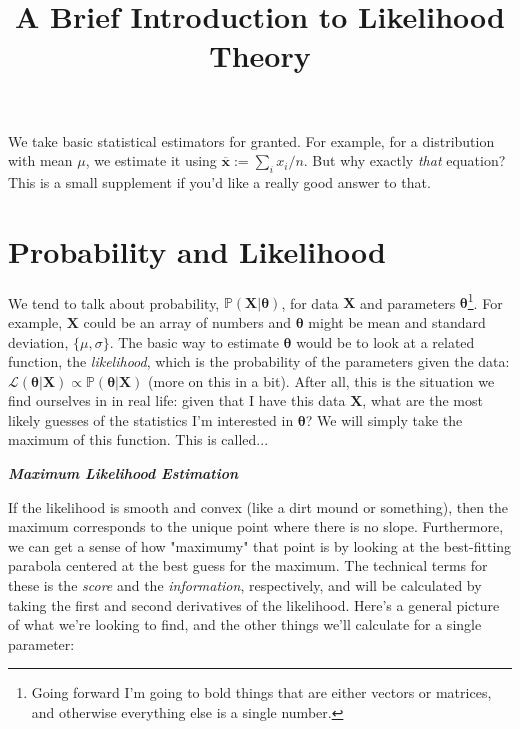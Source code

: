 \documentclass{article}
\title{A Brief Introduction to Likelihood Theory}
\date{}
\begin{document}
\maketitle

We take basic statistical estimators for granted. For example, for a distribution with mean $\mu$, we estimate it using $\overline{\mathbf{x}}:=\sum_i x_i/n$. But why exactly \textit{that} equation? This is a small supplement if you'd like a really good answer to that.

\section{Probability and Likelihood}

We tend to talk about probability, $\mathbb{P}(\mathbf{X}|\boldsymbol{\theta})$, for data $\mathbf{X}$ and parameters $\boldsymbol{\theta}$\footnote{Going forward I'm going to bold things that are either vectors or matrices, and otherwise everything else is a single number.}. For example, $\mathbf{X}$ could be an array of numbers and $\boldsymbol{\theta}$ might be mean and standard deviation, $\{\mu, \sigma\}$. The basic way to estimate $\boldsymbol{\theta}$ would be to look at a related function, the \textit{likelihood}, which is the probability of the parameters given the data: $\mathcal{L}(\boldsymbol{\theta}|\mathbf{X}) \propto \mathbb{P}(\boldsymbol{\theta}|\mathbf{X})$ (more on this in a bit). After all, this is the situation we find ourselves in in real life: given that I have this data $\mathbf{X}$, what are the most likely guesses of the statistics I'm interested in $\boldsymbol{\theta}$? We will simply take the maximum of this function. This is called...
\begin{center}
\textbf{\textit{Maximum Likelihood Estimation}}
\end{center}

If the likelihood is smooth and convex (like a dirt mound or something), then the maximum corresponds to the unique point where there is no slope. Furthermore, we can get a sense of how "maximumy" that point is by looking at the best-fitting parabola centered at the best guess for the maximum. The technical terms for these is the \textit{score} and the \textit{information}, respectively, and will be calculated by taking the first and second derivatives of the likelihood. Here's a general picture of what we're looking to find, and the other things we'll calculate for a single parameter:
\end{document}

